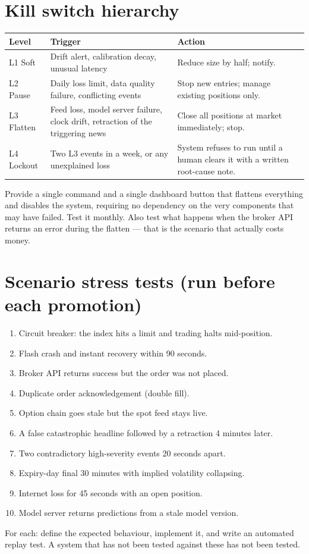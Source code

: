 \section{Kill switch hierarchy}

\begin{longtable}{@{}p{2.2cm}p{4.0cm}p{8.4cm}@{}}
\toprule
\textbf{Level} & \textbf{Trigger} & \textbf{Action}\\
\midrule
L1 Soft & Drift alert, calibration decay, unusual latency & Reduce size by half;
notify.\\
L2 Pause & Daily loss limit, data quality failure, conflicting events &
Stop new entries; manage existing positions only.\\
L3 Flatten & Feed loss, model server failure, clock drift, retraction of the
triggering news & Close all positions at market immediately; stop.\\
L4 Lockout & Two L3 events in a week, or any unexplained loss & System refuses to
run until a human clears it with a written root-cause note.\\
\bottomrule
\end{longtable}

\begin{warnbox}[title={Physical kill switch}]
Provide a single command and a single dashboard button that flattens everything
and disables the system, requiring no dependency on the very components that may
have failed. Test it monthly. Also test what happens when the broker API returns
an error during the flatten --- that is the scenario that actually costs money.
\end{warnbox}

\section{Scenario stress tests (run before each promotion)}

\begin{enumerate}
\item Circuit breaker: the index hits a limit and trading halts mid-position.
\item Flash crash and instant recovery within 90 seconds.
\item Broker API returns success but the order was not placed.
\item Duplicate order acknowledgement (double fill).
\item Option chain goes stale but the spot feed stays live.
\item A false catastrophic headline followed by a retraction 4 minutes later.
\item Two contradictory high-severity events 20 seconds apart.
\item Expiry-day final 30 minutes with implied volatility collapsing.
\item Internet loss for 45 seconds with an open position.
\item Model server returns predictions from a stale model version.
\end{enumerate}

For each: define the expected behaviour, implement it, and write an automated
replay test. A system that has not been tested against these has not been
tested.

